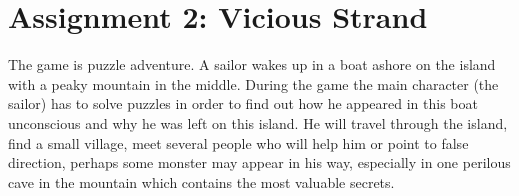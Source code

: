 \documentclass{article}
\begin{document}
\section*{Assignment 2: Vicious Strand}

The game is puzzle adventure. A sailor wakes up in a boat ashore on the island
with a peaky mountain in the middle. During the game the main character (the
sailor) has to solve puzzles in order to find out how he appeared in this boat
unconscious and why he was left on this island. He will travel through the
island, find a small village, meet several people who will help him or point to
false direction, perhaps some monster may appear in his way, especially in one
perilous cave in the mountain which contains the most valuable secrets.
\end{document}
